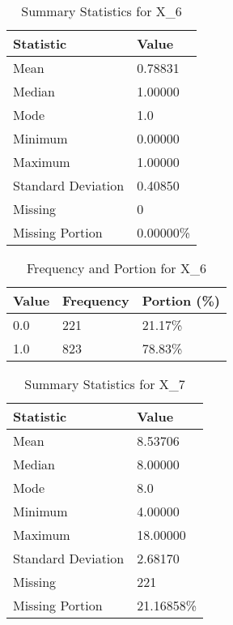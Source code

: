 \begin{table}[H]
\centering
\begin{tabular}{|l|l|}
\hline
\textbf{Statistic} & \textbf{Value} \\ \hline
Mean               & 0.78831 \\ \hline
Median             & 1.00000 \\ \hline
Mode               & 1.0 \\ \hline
Minimum            & 0.00000 \\ \hline
Maximum            & 1.00000 \\ \hline
Standard Deviation & 0.40850 \\ \hline
Missing            & 0 \\ \hline
Missing Portion    & 0.00000\% \\ \hline
\end{tabular}
\caption{Summary Statistics for X_6}
\end{table}

\begin{table}[H]
\centering
\begin{tabular}{|l|l|l|}
\hline
\textbf{Value} & \textbf{Frequency} & \textbf{Portion (\%)} \\ \hline
0.0 & 221 & 21.17\% \\ \hline
1.0 & 823 & 78.83\% \\ \hline
\end{tabular}
\caption{Frequency and Portion for X_6}
\end{table}

\begin{table}[H]
\centering
\begin{tabular}{|l|l|}
\hline
\textbf{Statistic} & \textbf{Value} \\ \hline
Mean               & 8.53706 \\ \hline
Median             & 8.00000 \\ \hline
Mode               & 8.0 \\ \hline
Minimum            & 4.00000 \\ \hline
Maximum            & 18.00000 \\ \hline
Standard Deviation & 2.68170 \\ \hline
Missing            & 221 \\ \hline
Missing Portion    & 21.16858\% \\ \hline
\end{tabular}
\caption{Summary Statistics for X_7}
\end{table}

